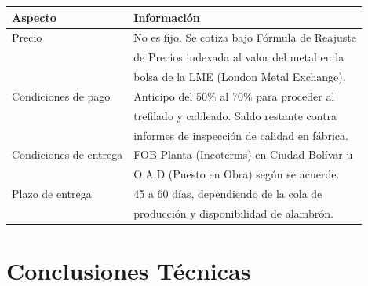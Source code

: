 \documentclass[12pt,a4paper]{article}
\begin{document}
\begin{center}
\begin{tabular}{ll}
\toprule
\textbf{Aspecto} & \textbf{Información} \\
\midrule
Precio & No es fijo. Se cotiza bajo Fórmula de Reajuste \\
& de Precios indexada al valor del metal en la \\
& bolsa de la LME (London Metal Exchange). \\
\midrule
Condiciones de pago & Anticipo del 50\% al 70\% para proceder al \\
& trefilado y cableado. Saldo restante contra \\
& informes de inspección de calidad en fábrica. \\
\midrule
Condiciones de entrega & FOB Planta (Incoterms) en Ciudad Bolívar u \\
& O.A.D (Puesto en Obra) según se acuerde. \\
\midrule
Plazo de entrega & 45 a 60 días, dependiendo de la cola de \\
& producción y disponibilidad de alambrón. \\
\bottomrule
\end{tabular}
\end{center}

\section{Conclusiones Técnicas}
\end{document}
